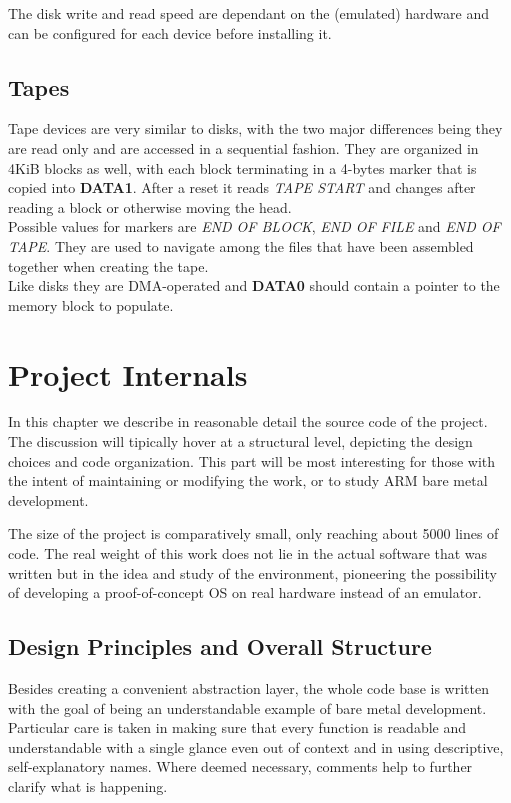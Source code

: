 \documentclass[12pt,a4paper,openright,twoside]{report}
\begin{document}
The disk write and read speed are dependant on the (emulated) hardware and can 
be configured for each device before installing it.

\section{Tapes}
Tape devices are very similar to disks, with the two major differences being they
are read only and are accessed in a sequential fashion.
They are organized in 4KiB blocks as well, with each block terminating in a
4-bytes marker that is copied into \textbf{DATA1}. After a reset it reads 
\textit{TAPE START} and changes after reading a block or otherwise moving the
head. \\
Possible values for markers are \textit{END OF BLOCK}, \textit{END OF FILE}
and \textit{END OF TAPE}. They are used to navigate among the files that have
been assembled together when creating the tape.\\
Like disks they are DMA-operated and \textbf{DATA0} should contain a pointer 
to the memory block to populate.

\clearpage{\pagestyle{empty}\cleardoublepage}
\chapter{Project Internals}
In this chapter we describe in reasonable detail the source code of the 
project. The discussion will tipically hover at a structural level, depicting 
the design choices and code organization. This part will be most interesting for
those with the intent of maintaining or modifying the work, or to study ARM
bare metal development.

The size of the project is comparatively small, only reaching about 5000 lines of 
code. The real weight of this work does not lie in the actual software that was
written but in the idea and study of the environment, pioneering the possibility
of developing a proof-of-concept OS on real hardware instead of an emulator.

\section{Design Principles and Overall Structure}
Besides creating a convenient abstraction layer, the whole code base is written 
with the goal of being an understandable example of bare metal development. Particular 
care is taken in making sure that every function is readable and understandable
with a single glance even out of context and in using descriptive, self-explanatory
names. Where deemed necessary, comments help to further clarify what is happening.
\end{document}
